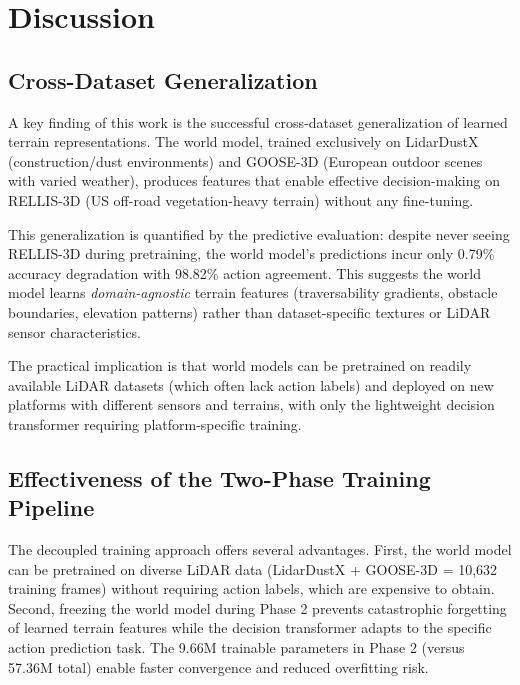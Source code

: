 \documentclass[sensors,article,submit,pdftex,moreauthors]{Definitions/mdpi}
\begin{document}
\section{Discussion}
\label{sec:discussion}

\subsection{Cross-Dataset Generalization}

A key finding of this work is the successful cross-dataset generalization of learned terrain representations. The world model, trained exclusively on LidarDustX (construction/dust environments) and GOOSE-3D (European outdoor scenes with varied weather), produces features that enable effective decision-making on RELLIS-3D (US off-road vegetation-heavy terrain) without any fine-tuning.

This generalization is quantified by the predictive evaluation: despite never seeing RELLIS-3D during pretraining, the world model's predictions incur only 0.79\% accuracy degradation with 98.82\% action agreement. This suggests the world model learns \emph{domain-agnostic} terrain features (traversability gradients, obstacle boundaries, elevation patterns) rather than dataset-specific textures or LiDAR sensor characteristics.

The practical implication is that world models can be pretrained on readily available LiDAR datasets (which often lack action labels) and deployed on new platforms with different sensors and terrains, with only the lightweight decision transformer requiring platform-specific training.

\subsection{Effectiveness of the Two-Phase Training Pipeline}

The decoupled training approach offers several advantages. First, the world model can be pretrained on diverse LiDAR data (LidarDustX + GOOSE-3D = 10,632 training frames) without requiring action labels, which are expensive to obtain. Second, freezing the world model during Phase 2 prevents catastrophic forgetting of learned terrain features while the decision transformer adapts to the specific action prediction task. The 9.66M trainable parameters in Phase 2 (versus 57.36M total) enable faster convergence and reduced overfitting risk.
\end{document}
